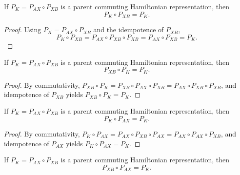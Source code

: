 \begin{theorem}%
    \label{thm:pK_comp_pXB}
    \leanok
    If $P_K = P_{AX} \circ P_{XB}$ is a parent commuting Hamiltonian
    representation, then
    \[
        P_K \circ P_{XB} = P_K.
    \]
\end{theorem}

\begin{proof}
    \leanok
    Using $P_K = P_{AX} \circ P_{XB}$ and the idempotence of $P_{XB}$,
    \[
        P_K \circ P_{XB}
        = P_{AX} \circ P_{XB} \circ P_{XB}
        = P_{AX} \circ P_{XB}
        = P_K.
    \]
\end{proof}

\begin{theorem}%
    \label{thm:pXB_comp_pK}
    \leanok
    If $P_K = P_{AX} \circ P_{XB}$ is a parent commuting Hamiltonian
    representation, then
    \[
        P_{XB} \circ P_K = P_K.
    \]
\end{theorem}

\begin{proof}
    \leanok
    By commutativity,
    $P_{XB} \circ P_K = P_{XB} \circ P_{AX} \circ P_{XB}
        = P_{AX} \circ P_{XB} \circ P_{XB}$, and idempotence of $P_{XB}$
    yields $P_{XB} \circ P_K = P_K$.
\end{proof}

\begin{theorem}%
    \label{thm:pK_comp_pAX}
    \leanok
    If $P_K = P_{AX} \circ P_{XB}$ is a parent commuting Hamiltonian
    representation, then
    \[
        P_K \circ P_{AX} = P_K.
    \]
\end{theorem}

\begin{proof}
    \leanok
    By commutativity,
    $P_K \circ P_{AX} = P_{AX} \circ P_{XB} \circ P_{AX}
        = P_{AX} \circ P_{AX} \circ P_{XB}$, and idempotence of $P_{AX}$
    yields $P_K \circ P_{AX} = P_K$.
\end{proof}

\begin{theorem}%
    \label{thm:reverse_product}
    \leanok
    If $P_K = P_{AX} \circ P_{XB}$ is a parent commuting Hamiltonian
    representation, then
    \[
        P_{XB} \circ P_{AX} = P_K.
    \]
\end{theorem}

